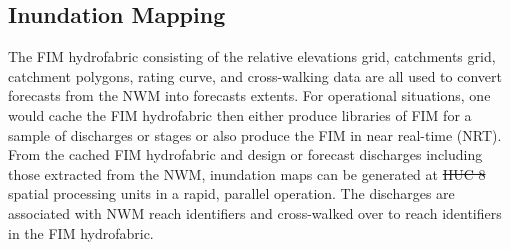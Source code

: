\documentclass[draft]{dependencies/agujournal2019}
\providecommand{\DIFadd}[1]{{\protect\color{blue}\uwave{#1}}} %
\providecommand{\DIFdel}[1]{{\protect\color{red}\sout{#1}}}                      %
\providecommand{\DIFaddbegin}{} %
\providecommand{\DIFaddend}{} %
\providecommand{\DIFdelbegin}{} %
\providecommand{\DIFdelend}{} %
\begin{document}
\subsection{Inundation Mapping}
\label{ssec:inundation_mapping}
%
The FIM hydrofabric consisting of the relative elevations grid, catchments grid, catchment polygons, rating curve, and cross-walking data are all used to convert forecasts from the NWM into forecasts extents.
For operational situations, one would cache the FIM hydrofabric then either produce libraries of FIM for a sample of discharges or stages or also produce the FIM in near real-time (NRT).
From the cached FIM hydrofabric and design or forecast discharges including those extracted from the NWM, inundation maps can be generated at \DIFdelbegin \DIFdel{HUC 8 }\DIFdelend \DIFaddbegin \DIFadd{HUC8 }\DIFaddend spatial processing units in a rapid, parallel operation. 
The discharges are associated with NWM reach identifiers and cross-walked over to reach identifiers in the FIM hydrofabric.
\end{document}
